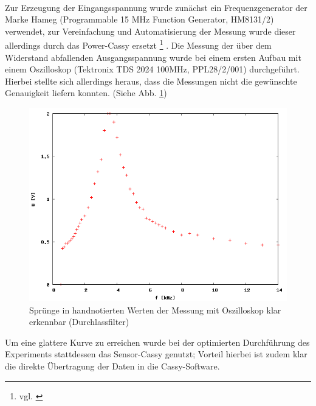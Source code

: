\paragraph{}
Zur Erzeugung der Eingangsspannung wurde zunächst ein Frequenzgenerator der Marke Hameg (Programmable 15 MHz Function Generator, HM8131/2) verwendet, zur Vereinfachung und Automatisierung der Messung wurde dieser allerdings durch das Power-Cassy ersetzt \footnote{vgl. \cite[42f.]{cassy2013manual}} .
Die Messung der über dem Widerstand abfallenden Ausgangsspannung wurde bei einem ersten Aufbau mit einem Oszilloskop (Tektronix TDS 2024 100MHz, PPL28/2/001) durchgeführt. Hierbei stellte sich allerdings heraus, dass die Messungen nicht die gewünschte Genauigkeit liefern konnten. (Siehe Abb. \ref{plot:oszi})
\begin{figure}
	\includegraphics[width=.9\textwidth]{images/plot/oszi.png}
\caption{Sprünge in handnotierten Werten der Messung mit Oszilloskop klar erkennbar (Durchlassfilter)}
\label{plot:oszi}
\end{figure}
Um eine glattere Kurve zu erreichen wurde bei der optimierten Durchführung des Experiments stattdessen das Sensor-Cassy genutzt; Vorteil hierbei ist zudem klar die direkte Übertragung der Daten in die Cassy-Software.

